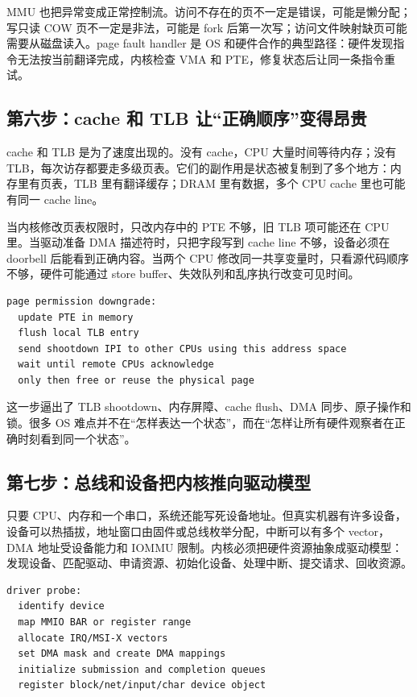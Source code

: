 MMU 也把异常变成正常控制流。访问不存在的页不一定是错误，可能是懒分配；写只读 COW 页不一定是非法，可能是 fork 后第一次写；访问文件映射缺页可能需要从磁盘读入。page fault handler 是 OS 和硬件合作的典型路径：硬件发现指令无法按当前翻译完成，内核检查 VMA 和 PTE，修复状态后让同一条指令重试。

\subsection{第六步：cache 和 TLB 让“正确顺序”变得昂贵}

cache 和 TLB 是为了速度出现的。没有 cache，CPU 大量时间等待内存；没有 TLB，每次访存都要走多级页表。它们的副作用是状态被复制到了多个地方：内存里有页表，TLB 里有翻译缓存；DRAM 里有数据，多个 CPU cache 里也可能有同一 cache line。

当内核修改页表权限时，只改内存中的 PTE 不够，旧 TLB 项可能还在 CPU 里。当驱动准备 DMA 描述符时，只把字段写到 cache line 不够，设备必须在 doorbell 后能看到正确内容。当两个 CPU 修改同一共享变量时，只看源代码顺序不够，硬件可能通过 store buffer、失效队列和乱序执行改变可见时间。

\begin{lstlisting}
page permission downgrade:
  update PTE in memory
  flush local TLB entry
  send shootdown IPI to other CPUs using this address space
  wait until remote CPUs acknowledge
  only then free or reuse the physical page
\end{lstlisting}

这一步逼出了 TLB shootdown、内存屏障、cache flush、DMA 同步、原子操作和锁。很多 OS 难点并不在“怎样表达一个状态”，而在“怎样让所有硬件观察者在正确时刻看到同一个状态”。

\subsection{第七步：总线和设备把内核推向驱动模型}

只要 CPU、内存和一个串口，系统还能写死设备地址。但真实机器有许多设备，设备可以热插拔，地址窗口由固件或总线枚举分配，中断可以有多个 vector，DMA 地址受设备能力和 IOMMU 限制。内核必须把硬件资源抽象成驱动模型：发现设备、匹配驱动、申请资源、初始化设备、处理中断、提交请求、回收资源。

\begin{lstlisting}
driver probe:
  identify device
  map MMIO BAR or register range
  allocate IRQ/MSI-X vectors
  set DMA mask and create DMA mappings
  initialize submission and completion queues
  register block/net/input/char device object
\end{lstlisting}

